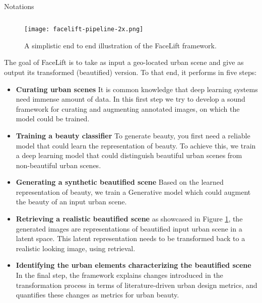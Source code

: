 \begin{table}[t]
{\begin{tabular}{l|p{8cm}}
    \end{tabular}}
    \caption{Notations}\label{notations}
\end{table}

\begin{figure}[ht]
    \centering
    \texttt{[image: facelift-pipeline-2x.png]}
    \caption{A simplistic end to end illustration of the FaceLift framework.}
    \label{fig:framework}
\end{figure}

The goal of FaceLift is to take as input a geo-located urban scene and give as output its transformed (beautified) version. 
To that end, it performs in five steps: 
\begin{itemize}
    \item \textbf{Curating urban scenes} It is common knowledge that deep learning systems need immense amount of data. In this first step we try to develop a sound framework for curating and augmenting annotated images, on which the model could be trained.
    \item \textbf{ Training a beauty classifier} To generate beauty, you first need a reliable model that could learn the representation of beauty. To achieve this, we train a deep learning model that could distinguish beautiful urban scenes from non-beautiful urban scenes. 
    \item \textbf{Generating a synthetic beautified scene} Based on the learned representation of beauty, we train a Generative model which could augment the beauty of an input urban scene. 
    \item \textbf{Retrieving a realistic beautified scene} as showcased in Figure \ref{fig:framework}, the generated images are representations of beautified input urban scene in a latent space. This latent representation needs to be transformed back to a realistic looking image, using retrieval.
    \item \textbf{Identifying the urban elements characterizing the beautified scene} In the final step, the framework explains changes introduced in the transformation process in terms of literature-driven urban design metrics, and quantifies these changes as metrics for urban beauty.
\end{itemize}


